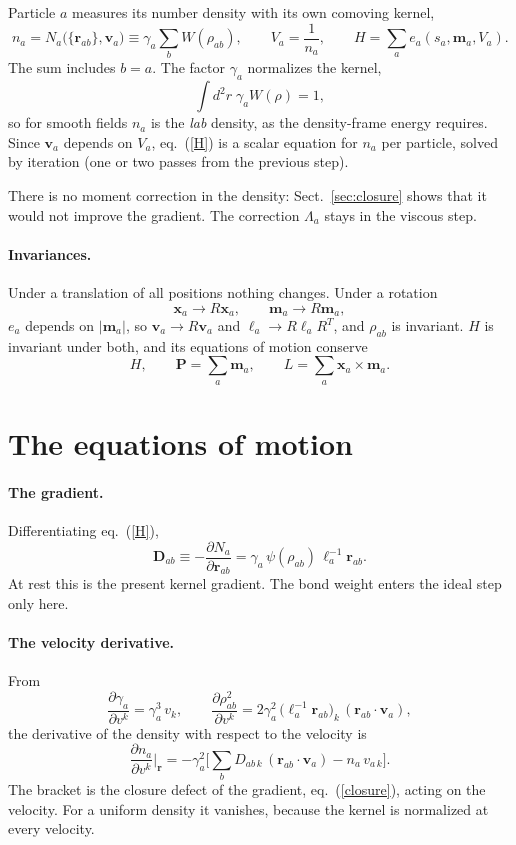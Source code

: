 \documentclass[11pt,aps,preprint,nofootinbib,superscriptaddress,tightenlines]{revtex4-2}
\def\st{\begin{equation}}
\def\stp{\end{equation}}
\def\Eq#1{eq.~(\ref{#1})}
\def\Sect#1{Sect.~\ref{#1}}
\let\oldparagraph\paragraph
\renewcommand{\paragraph}{\par\bigskip\oldparagraph}
\begin{document}
Particle $a$ measures its number density with its own comoving kernel,
\st
\boxed{\;
n_a=N_a\big(\{\bm r_{ab}\},\bm v_a\big)\equiv\gamma_a\sum_bW(\rho_{ab}),\qquad
V_a=\frac1{n_a},\qquad H=\sum_ae_a(s_a,\bm m_a,V_a) .\;}
\label{H}
\stp
The sum includes $b=a$.  The factor $\gamma_a$ normalizes the kernel,
\st
\int d^2r\;\gamma_aW(\rho)=1 ,
\stp
so for smooth fields $n_a$ is the \emph{lab} density, as the density-frame energy requires.  Since $\bm v_a$ depends on $V_a$,
\Eq{H} is a scalar equation for $n_a$ per particle, solved by iteration (one or two passes from the previous step).

There is no moment correction in the density: \Sect{sec:closure} shows that it would not improve the gradient.  The correction
$\Lambda_a$ stays in the viscous step.

\paragraph{Invariances.}  Under a translation of all positions nothing changes.  Under a rotation
\st
\bm x_a\to R\bm x_a,\qquad \bm m_a\to R\bm m_a ,
\stp
$e_a$ depends on $|\bm m_a|$, so $\bm v_a\to R\bm v_a$ and $\ell_a\to R\ell_aR^T$, and $\rho_{ab}$ is invariant.  $H$ is invariant under
both, and its equations of motion conserve
\st
H,\qquad \bm P=\sum_a\bm m_a,\qquad L=\sum_a\bm x_a\times\bm m_a .
\stp

\section{The equations of motion}
\label{sec:eom}

\paragraph{The gradient.}  Differentiating \Eq{H},
\st
\bm D_{ab}\equiv-\frac{\partial N_a}{\partial\bm r_{ab}}=\gamma_a\,\psi(\rho_{ab})\,\ell_a^{-1}\bm r_{ab} .
\label{D}
\stp
At rest this is the present kernel gradient.  The bond weight enters the ideal step only here.

\paragraph{The velocity derivative.}  From
\st
\frac{\partial\gamma_a}{\partial v^k}=\gamma_a^3\,v_k,\qquad
\frac{\partial\rho_{ab}^2}{\partial v^k}=2\gamma_a^2\,\big(\ell_a^{-1}\bm r_{ab}\big)_k\,(\bm r_{ab}\cdot\bm v_a) ,
\stp
the derivative of the density with respect to the velocity is
\st
\frac{\partial n_a}{\partial v^k}\Big|_{\bm r}=-\gamma_a^2\Big[\sum_bD_{ab\,k}\,(\bm r_{ab}\cdot\bm v_a)-n_a\,v_{a\,k}\Big] .
\label{dndv}
\stp
The bracket is the closure defect of the gradient, \Eq{closure}, acting on the velocity.  For a uniform density it vanishes, because
the kernel is normalized at every velocity.
\end{document}

